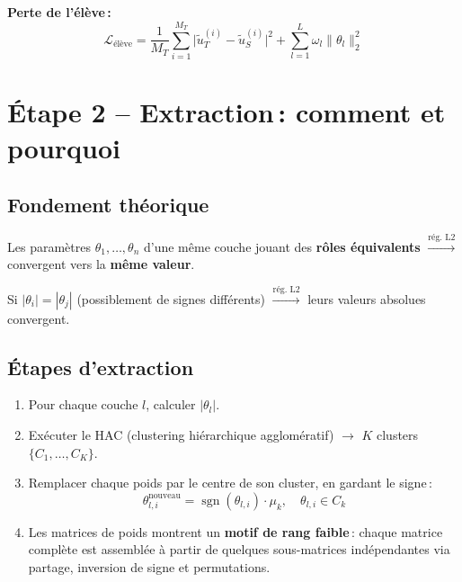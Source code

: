 \documentclass[11pt,a4paper]{article}
\begin{document}
\textbf{Perte de l'élève\,:}
\begin{equation}
\mathcal{L}_{\text{élève}} = \frac{1}{M_T}\sum_{i=1}^{M_T} \big|\tilde{u}_T^{(i)} - \tilde{u}_S^{(i)}\big|^2 + \sum_{l=1}^{L} \omega_l \|\theta_l\|_2^2
\end{equation}

\section{Étape 2 -- Extraction\,: comment et pourquoi}

\subsection{Fondement théorique}

\begin{tcolorbox}[colback=yellow!6,colframe=orange!60!black,title={\small Théorème 1\,: Les paramètres équivalents convergent}]
\small Les paramètres $\theta_1,\dots,\theta_n$ d'une même couche jouant des \textbf{rôles équivalents} $\xrightarrow{\text{rég.\ L2}}$ convergent vers la \textbf{même valeur}.
\end{tcolorbox}

\begin{tcolorbox}[colback=yellow!6,colframe=orange!60!black,title={\small Théorème 2\,: Les paramètres symétriques convergent en valeur absolue}]
\small Si $|\theta_i|=|\theta_j|$ (possiblement de signes différents) $\xrightarrow{\text{rég.\ L2}}$ leurs valeurs absolues convergent.
\end{tcolorbox}

\subsection{Étapes d'extraction}

\begin{enumerate}[leftmargin=1.8em,itemsep=2pt]
\item Pour chaque couche $l$, calculer $|\theta_l|$.
\item Exécuter le HAC (clustering hiérarchique agglomératif) $\longrightarrow$ $K$ clusters $\{C_1,\dots,C_K\}$.
\item Remplacer chaque poids par le centre de son cluster, en gardant le signe\,:
\begin{equation}
    \theta_{l,i}^{\text{nouveau}} = \operatorname{sgn}(\theta_{l,i})\cdot\mu_k, \quad \theta_{l,i}\in C_k
\end{equation}
\item Les matrices de poids montrent un \textbf{motif de rang faible}\,: chaque matrice complète est assemblée à partir de quelques sous-matrices indépendantes via partage, inversion de signe et permutations.
\end{enumerate}
\end{document}
